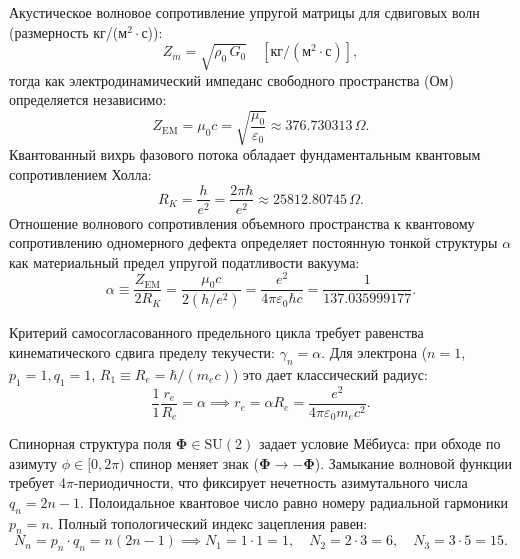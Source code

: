 \documentclass[11pt,a4paper]{article}
\theoremstyle{definition}
\theoremstyle{remark}
\begin{document}
Акустическое волновое сопротивление упругой матрицы для сдвиговых волн (размерность кг/(м$^2\cdot$с)):
\begin{equation}
    Z_m = \sqrt{\rho_0 \, G_0} \quad \left[\text{кг}/(\text{м}^2 \cdot \text{с})\right],
\end{equation}
тогда как электродинамический импеданс свободного пространства (Ом) определяется независимо:
\begin{equation}
    Z_{\mathrm{EM}} = \mu_0 c = \sqrt{\frac{\mu_0}{\varepsilon_0}} \approx 376.730313\,\Omega.
\end{equation}
Квантованный вихрь фазового потока обладает фундаментальным квантовым сопротивлением Холла:
\begin{equation}
    R_K = \frac{h}{e^2} = \frac{2\pi \hbar}{e^2} \approx 25812.80745\,\Omega.
\end{equation}
Отношение волнового сопротивления объемного пространства к квантовому сопротивлению одномерного дефекта определяет постоянную тонкой структуры $\alpha$ как материальный предел упругой податливости вакуума:
\begin{equation}
    \alpha \equiv \frac{Z_{\mathrm{EM}}}{2 R_K} = \frac{\mu_0 c}{2 (h/e^2)} = \frac{e^2}{4\pi \varepsilon_0 \hbar c} = \frac{1}{137.035999177}.
    \label{eq:alpha_impedance}
\end{equation}

Критерий самосогласованного предельного цикла требует равенства кинематического сдвига пределу текучести: $\gamma_n = \alpha$. Для электрона ($n=1$, $p_1=1, q_1=1$, $R_1 \equiv R_e = \hbar/(m_e c)$) это дает классический радиус:
\begin{equation}
    \frac{1}{1} \frac{r_e}{R_e} = \alpha \implies r_e = \alpha R_e = \frac{e^2}{4\pi\varepsilon_0 m_e c^2}.
\end{equation}

Спинорная структура поля $\boldsymbol{\Phi} \in \mathrm{SU}(2)$ задает условие Мёбиуса: при обходе по азимуту $\phi \in [0, 2\pi)$ спинор меняет знак ($\boldsymbol{\Phi} \to -\boldsymbol{\Phi}$). Замыкание волновой функции требует $4\pi$-периодичности, что фиксирует нечетность азимутального числа $q_n = 2n - 1$. Полоидальное квантовое число равно номеру радиальной гармоники $p_n = n$. Полный топологический индекс зацепления равен:
\begin{equation}
    N_n = p_n \cdot q_n = n(2n - 1) \implies N_1 = 1 \cdot 1 = 1, \quad N_2 = 2 \cdot 3 = 6, \quad N_3 = 3 \cdot 5 = 15.
    \label{eq:n_spectrum}
\end{equation}
\end{document}
